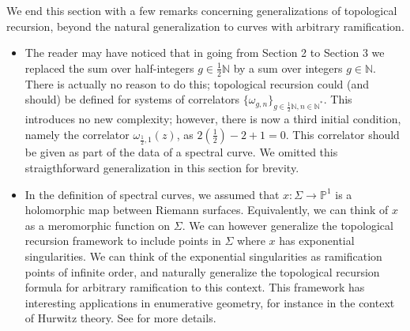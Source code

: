 \documentclass[reqno,oneside,11pt]{amsart}
\theoremstyle{plain}
\theoremstyle{definition}
\theoremstyle{remark}
\numberwithin{equation}{section}
\begin{document}
\label{s:remarks}

We end this section with a few remarks concerning generalizations of topological recursion, beyond the natural generalization to curves with arbitrary ramification.
\begin{itemize}
\item The reader may have noticed that in going from Section 2 to Section 3 we replaced the sum over half-integers $g \in \frac{1}{2}{\mathbb{N}}$ by a sum over integers $g \in \mathbb{N}$. There is actually no reason to do this; topological recursion could (and should) be defined for systems of correlators $\{ \omega_{g,n} \}_{g \in \frac{1}{2} \mathbb{N}, n \in \mathbb{N}^*}$. This introduces no new complexity; however, there is now a third initial condition, namely the correlator $\omega_{\frac{1}{2}, 1}(z)$, as $2(\frac{1}{2}) -2 + 1 = 0$. This correlator should be given as part of the data of a spectral curve. We omitted this straigthforward generalization in this section for brevity.
\item In the definition of spectral curves, we assumed that $x: \Sigma \to \mathbb{P}^1$ is a holomorphic map between Riemann surfaces. Equivalently, we can think of $x$ as a meromorphic function on $\Sigma$. We can however generalize the topological recursion framework to include points in $\Sigma$ where $x$ has exponential singularities. We can think of the exponential singularities as ramification points of infinite order, and naturally generalize the topological recursion formula for arbitrary ramification to this context. This framework has interesting applications in enumerative geometry, for instance in the context of Hurwitz theory. See \cite{BKW23} for more details.

\end{itemize}
\end{document}

